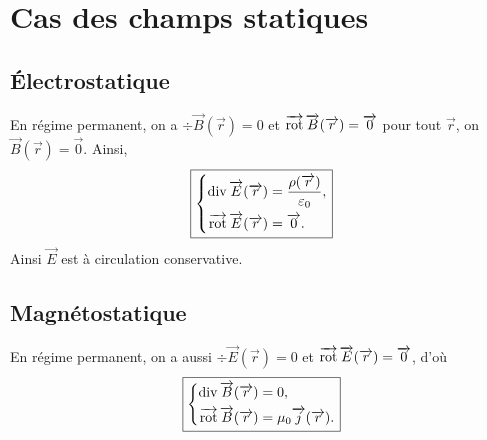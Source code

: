 \section{Cas des champs statiques}
\subsection{Électrostatique}

En régime permanent, on a $\div\vec{B}(\vec{r})=0$ et $\vecrot\vec{B}(\vec{r})=\vec{0}$ pour tout $\vec{r}$, on $\vec{B}(\vec{r})=\vec{0}$. Ainsi,
\begin{equation*}
    \boxed{
        \left\lbrace
        \begin{aligned}
            \div\vec{E}(\vec{r})&=\frac{\rho(\vec{r})}{\varepsilon_0},\\
            \vecrot\vec{E}(\vec{r})&=\vec{0}.
        \end{aligned}
        \right.
    }
\end{equation*}
Ainsi $\vec{E}$ est à circulation conservative.

\subsection{Magnétostatique}

En régime permanent, on a aussi $\div\vec{E}(\vec{r})=0$ et $\vecrot\vec{E}(\vec{r})=\vec{0}$, d'où
\begin{equation*}
    \boxed{
        \left\lbrace
        \begin{aligned}
            \div\vec{B}(\vec{r})&=0,\\
            \vecrot\vec{B}(\vec{r})&=\mu_0\vec{j}(\vec{r}).
        \end{aligned}
        \right.
    }
\end{equation*}